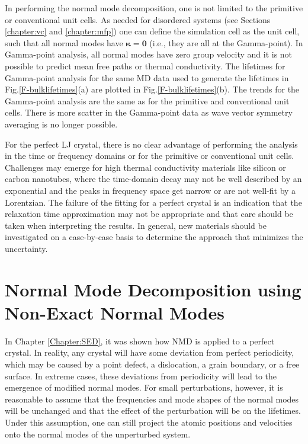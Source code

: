 
In performing the normal mode decomposition, one is not limited to the 
primitive or conventional unit cells. As needed for disordered systems 
(see Sections \ref{chapter:vc} and \ref{chapter:mfp}) one can define the 
simulation cell as the unit cell, such that all normal modes have 
$\pmb{\kappa}=\mathbf{0}$ (i.e., they are all at the Gamma-point). 
In Gamma-point analysis, all normal modes have zero group 
velocity and 
it is not possible to predict mean free paths or thermal 
conductivity. The lifetimes for Gamma-point analysis for the same MD 
data used to generate the lifetimes in Fig.\ref{F-bulklifetimes}(a)   
are plotted in Fig.\ref{F-bulklifetimes}(b). The trends for the 
Gamma-point analysis are the same as for the primitive and conventional 
unit cells. There is more scatter in the Gamma-point data as wave 
vector symmetry averaging is no longer possible.

For the perfect LJ crystal, there is no clear advantage of performing 
the analysis in the time or frequency domains or for the primitive or 
conventional unit cells. Challenges may emerge for high thermal 
conductivity materials like silicon or carbon nanotubes, where the 
time-domain decay may not be well described by an exponential and the 
peaks in frequency space get narrow or are not well-fit by a Lorentzian. 
The failure of the fitting for a perfect crystal is an indication that 
the relaxation time approximation may not be appropriate and that care 
should be taken when interpreting the results. In general, new materials 
should be investigated on a case-by-case basis to determine the approach 
that minimizes the uncertainty.

\section{\label{A:NMD XCORR}Normal Mode Decomposition using Non-Exact 
Normal Modes}

In Chapter \ref{Chapter:SED}, it was shown how NMD is 
applied to a perfect crystal. In reality, any crystal will have some 
deviation from perfect periodicity, which may be caused by a point defect, 
a dislocation, a grain boundary, or a free surface. In extreme cases, 
these deviations from periodicity will lead to the emergence of modified 
normal modes. For small perturbations, however, it is reasonable to
assume that the frequencies and mode shapes of the normal modes will 
be unchanged and that the effect of the perturbation will be on the 
lifetimes. Under this assumption, one can still project the atomic 
positions and velocities onto the normal modes of the unperturbed system.

